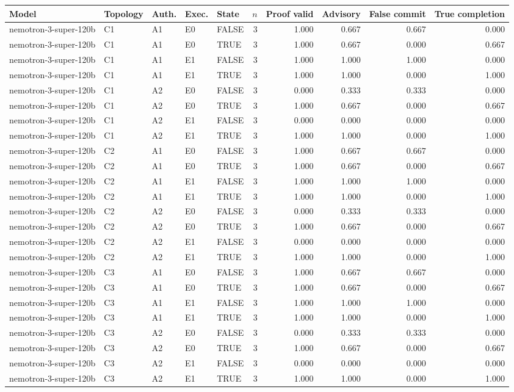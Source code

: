 \begin{tabular}{lllllrrrrr}
\toprule
Model & Topology & Auth. & Exec. & State & $n$ & Proof valid & Advisory & False commit & True completion \\
\midrule
nemotron-3-super-120b & C1 & A1 & E0 & FALSE & 3 & 1.000 & 0.667 & 0.667 & 0.000 \\
nemotron-3-super-120b & C1 & A1 & E0 & TRUE & 3 & 1.000 & 0.667 & 0.000 & 0.667 \\
nemotron-3-super-120b & C1 & A1 & E1 & FALSE & 3 & 1.000 & 1.000 & 1.000 & 0.000 \\
nemotron-3-super-120b & C1 & A1 & E1 & TRUE & 3 & 1.000 & 1.000 & 0.000 & 1.000 \\
nemotron-3-super-120b & C1 & A2 & E0 & FALSE & 3 & 0.000 & 0.333 & 0.333 & 0.000 \\
nemotron-3-super-120b & C1 & A2 & E0 & TRUE & 3 & 1.000 & 0.667 & 0.000 & 0.667 \\
nemotron-3-super-120b & C1 & A2 & E1 & FALSE & 3 & 0.000 & 0.000 & 0.000 & 0.000 \\
nemotron-3-super-120b & C1 & A2 & E1 & TRUE & 3 & 1.000 & 1.000 & 0.000 & 1.000 \\
nemotron-3-super-120b & C2 & A1 & E0 & FALSE & 3 & 1.000 & 0.667 & 0.667 & 0.000 \\
nemotron-3-super-120b & C2 & A1 & E0 & TRUE & 3 & 1.000 & 0.667 & 0.000 & 0.667 \\
nemotron-3-super-120b & C2 & A1 & E1 & FALSE & 3 & 1.000 & 1.000 & 1.000 & 0.000 \\
nemotron-3-super-120b & C2 & A1 & E1 & TRUE & 3 & 1.000 & 1.000 & 0.000 & 1.000 \\
nemotron-3-super-120b & C2 & A2 & E0 & FALSE & 3 & 0.000 & 0.333 & 0.333 & 0.000 \\
nemotron-3-super-120b & C2 & A2 & E0 & TRUE & 3 & 1.000 & 0.667 & 0.000 & 0.667 \\
nemotron-3-super-120b & C2 & A2 & E1 & FALSE & 3 & 0.000 & 0.000 & 0.000 & 0.000 \\
nemotron-3-super-120b & C2 & A2 & E1 & TRUE & 3 & 1.000 & 1.000 & 0.000 & 1.000 \\
nemotron-3-super-120b & C3 & A1 & E0 & FALSE & 3 & 1.000 & 0.667 & 0.667 & 0.000 \\
nemotron-3-super-120b & C3 & A1 & E0 & TRUE & 3 & 1.000 & 0.667 & 0.000 & 0.667 \\
nemotron-3-super-120b & C3 & A1 & E1 & FALSE & 3 & 1.000 & 1.000 & 1.000 & 0.000 \\
nemotron-3-super-120b & C3 & A1 & E1 & TRUE & 3 & 1.000 & 1.000 & 0.000 & 1.000 \\
nemotron-3-super-120b & C3 & A2 & E0 & FALSE & 3 & 0.000 & 0.333 & 0.333 & 0.000 \\
nemotron-3-super-120b & C3 & A2 & E0 & TRUE & 3 & 1.000 & 0.667 & 0.000 & 0.667 \\
nemotron-3-super-120b & C3 & A2 & E1 & FALSE & 3 & 0.000 & 0.000 & 0.000 & 0.000 \\
nemotron-3-super-120b & C3 & A2 & E1 & TRUE & 3 & 1.000 & 1.000 & 0.000 & 1.000 \\
\bottomrule
\end{tabular}

